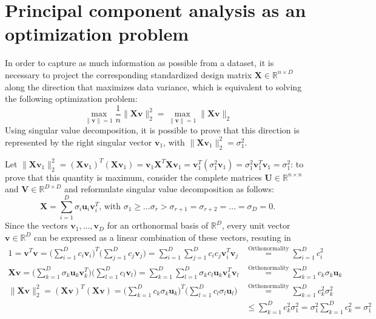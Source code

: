 \documentclass{report}
\begin{document}
\section{Principal component analysis as an optimization problem}
In order to capture as much information as possible from a dataset, it is necessary to project the corresponding standardized design matrix $\displaystyle \mathbf{X} \in \mathbb{R}^{n \times D}$ along the direction that maximizes data variance, which is equivalent to solving the following optimization problem:
\[\max_{\lVert \mathbf{v} \rVert = 1} \frac{1}{n}\lVert \mathbf{Xv} \rVert_2^2 = \max_{\lVert \mathbf{v} \rVert = 1} \lVert \mathbf{Xv} \rVert_2\]
Using singular value decomposition, it is possible to prove that this direction is represented by the right singular vector $\displaystyle \mathbf{v}_1$, with $\displaystyle \lVert \mathbf{Xv}_1 \rVert_2^2 = \sigma_1^2$.
\begin{proofbox}
    Let $\displaystyle \lVert \mathbf{Xv}_1 \rVert_2^2 = (\mathbf{Xv}_1)^T(\mathbf{Xv}_1) = \mathbf{v}_1\mathbf{X}^T\mathbf{Xv}_1 = \mathbf{v}_1^T(\sigma_1^2\mathbf{v}_1) = \sigma_1^2\mathbf{v}_1^T\mathbf{v}_1 = \sigma_1^2$: to prove that this quantity is maximum, consider the complete matrices $\displaystyle \mathbf{U} \in \mathbb{R}^{n \times n}$ and $\displaystyle \mathbf{V} \in \mathbb{R}^{D \times D}$ and reformulate singular value decomposition as follows:
    \[\mathbf{X} = \sum_{i = 1}^D \sigma_i\mathbf{u}_i\mathbf{v}_i^T \text{, with $\sigma_1 \ge \dots \sigma_r > \sigma_{r + 1} = \sigma_{r + 2} = \dots = \sigma_D = 0$.}\]
    Since the vectors $\displaystyle \mathbf{v}_1, \dots, \mathbf{v}_D$ for an orthonormal basis of $\displaystyle \mathbb{R}^D$, every unit vector $\displaystyle \mathbf{v} \in \mathbb{R}^D$ can be expressed as a linear combination of these vectors, resuting in
    \begin{align*}
        1 = \mathbf{v}^T\mathbf{v} = \Bigg(\sum_{i = 1}^D c_i\mathbf{v}_i\Bigg)^T\Bigg(\sum_{j = 1}^D c_j\mathbf{v}_j\Bigg) = \sum_{i = 1}^D\sum_{j = 1}^D c_ic_j\mathbf{v}_i^T\mathbf{v}_j &\stackrel{\text{Orthonormality}}{=} \sum_{i = 1}^D c_i^2 \\
        \mathbf{Xv} = \Bigg(\sum_{k = 1}^D \sigma_k\mathbf{u}_k\mathbf{v}_k^T\Bigg)\Bigg(\sum_{l = 1}^D c_l\mathbf{v}_l\Bigg) = \sum_{k = 1}^D\sum_{l = 1}^D \sigma_kc_l\mathbf{u}_k\mathbf{v}_k^T\mathbf{v}_l &\stackrel{\text{Orthonormality}}{=} \sum_{k = 1}^D c_k\sigma_k\mathbf{u}_k \\
        \lVert \mathbf{Xv} \rVert_2^2 = (\mathbf{Xv})^T(\mathbf{Xv}) = \Bigg(\sum_{k = 1}^D c_k\sigma_k\mathbf{u}_k\Bigg)^T\Bigg(\sum_{l = 1}^D c_l\sigma_l\mathbf{u}_l\Bigg) &\stackrel{\text{Orthonormality}}{=} \sum_{k = 1}^D c_k^2\sigma_k^2 \\
        &\leq \sum_{k = 1}^D c_k^2\sigma_1^2 = \sigma_1^2\sum_{k = 1}^D c_k^2 = \sigma_1^2
    \end{align*}
\end{proofbox}
\end{document}
